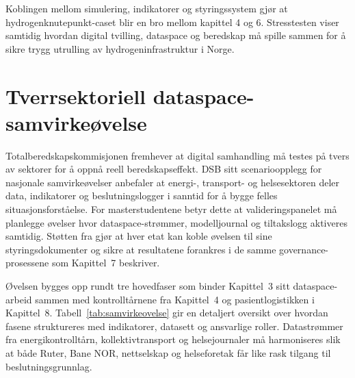Koblingen mellom simulering, indikatorer og styringssystem gjør at hydrogenknutepunkt-caset blir en bro mellom kapittel 4 og 6. Stresstesten viser samtidig hvordan digital tvilling, dataspace og beredskap må spille sammen for å sikre trygg utrulling av hydrogeninfrastruktur i Norge.

\section{Tverrsektoriell dataspace-samvirkeøvelse}
Totalberedskapskommisjonen fremhever at digital samhandling må testes på tvers av sektorer for å oppnå reell beredskapseffekt.\citep{dsb2023totalberedskap} DSB sitt scenarioopplegg for nasjonale samvirkeøvelser anbefaler at energi-, transport- og helsesektoren deler data, indikatorer og beslutningslogger i sanntid for å bygge felles situasjonsforståelse.\citep{dsb2024nser} For masterstudentene betyr dette at valideringspanelet må planlegge øvelser hvor dataspace-strømmer, modelljournal og tiltakslogg aktiveres samtidig. Støtten fra \citet{digdir2024samstyring} gjør at hver etat kan koble øvelsen til sine styringsdokumenter og sikre at resultatene forankres i de samme governance-prosessene som Kapittel~7 beskriver.

Øvelsen bygges opp rundt tre hovedfaser som binder Kapittel~3 sitt dataspace-arbeid sammen med kontrolltårnene fra Kapittel~4 og pasientlogistikken i Kapittel~8. Tabell~\ref{tab:samvirkeovelse} gir en detaljert oversikt over hvordan fasene struktureres med indikatorer, datasett og ansvarlige roller. Datastrømmer fra energikontrolltårn, kollektivtransport og helsejournaler må harmoniseres slik at både Ruter, Bane NOR, nettselskap og helseforetak får like rask tilgang til beslutningsgrunnlag.\citep{ruter2024mobilitetslab,banenor2024digitalspor,energinorge2023beredskap,helsedir2023beredskap}

